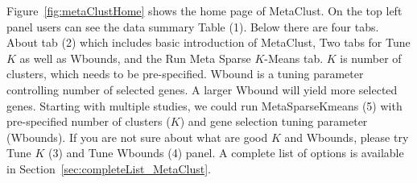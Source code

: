Figure~\ref{fig:metaClustHome} shows the home page of MetaClust.
On the top left panel users can see the data summary Table {\color{red} (1)}.
Below there are four tabs. 
About tab {\color{red} (2)} which includes basic introduction of MetaClust, Two tabs for Tune $K$ as well as Wbounds, and the Run Meta Sparse $K$-Means tab.
$K$ is number of clusters, which needs to be pre-specified.
Wbound is a tuning parameter controlling number of selected genes.
A larger Wbound will yield more selected genes.
Starting with multiple studies, 
we could run MetaSparseKmeans {\color{red} (5)} with pre-specified number of clusters ($K$) and gene selection tuning parameter (Wbounds).
If you are not sure about what are good $K$ and Wbounds, 
please try Tune $K$ {\color{red} (3)} and Tune Wbounds {\color{red} (4)} panel.
A complete list of options is available in Section~\ref{sec:completeList_MetaClust}.

